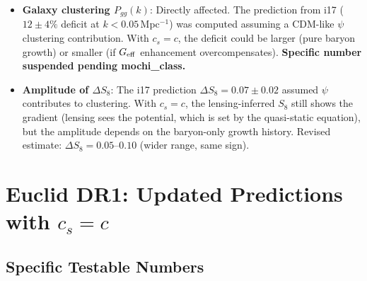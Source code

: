 \documentclass[11pt,a4paper]{article}
\newcommand{\Geff}{G_{\rm eff}}
\begin{document}
\begin{crisisbox}[$c_s = c$ --- WHAT EXACTLY CHANGES]
\begin{itemize}[nosep]
\item \textbf{Galaxy clustering $P_{gg}(k)$}: Directly affected.
  The prediction from i17 ($12 \pm 4\%$ deficit at
  $k < 0.05$\,Mpc$^{-1}$) was computed assuming a CDM-like $\psi$
  clustering contribution. With $c_s = c$, the deficit could be
  larger (pure baryon growth) or smaller (if $\Geff$ enhancement
  overcompensates). \textbf{Specific number suspended pending
  mochi\_class.}

\item \textbf{Amplitude of $\Delta S_8$}: The i17 prediction
  $\Delta S_8 = 0.07 \pm 0.02$ assumed $\psi$ contributes to
  clustering. With $c_s = c$, the lensing-inferred $S_8$ still
  shows the gradient (lensing sees the potential, which is set by
  the quasi-static equation), but the amplitude depends on the
  baryon-only growth history. Revised estimate:
  $\Delta S_8 = 0.05$--$0.10$ (wider range, same sign).
\end{itemize}

\end{crisisbox}


\section{Euclid DR1: Updated Predictions with $c_s = c$}
\label{sec:euclid}

\subsection{Specific Testable Numbers}
\end{document}
